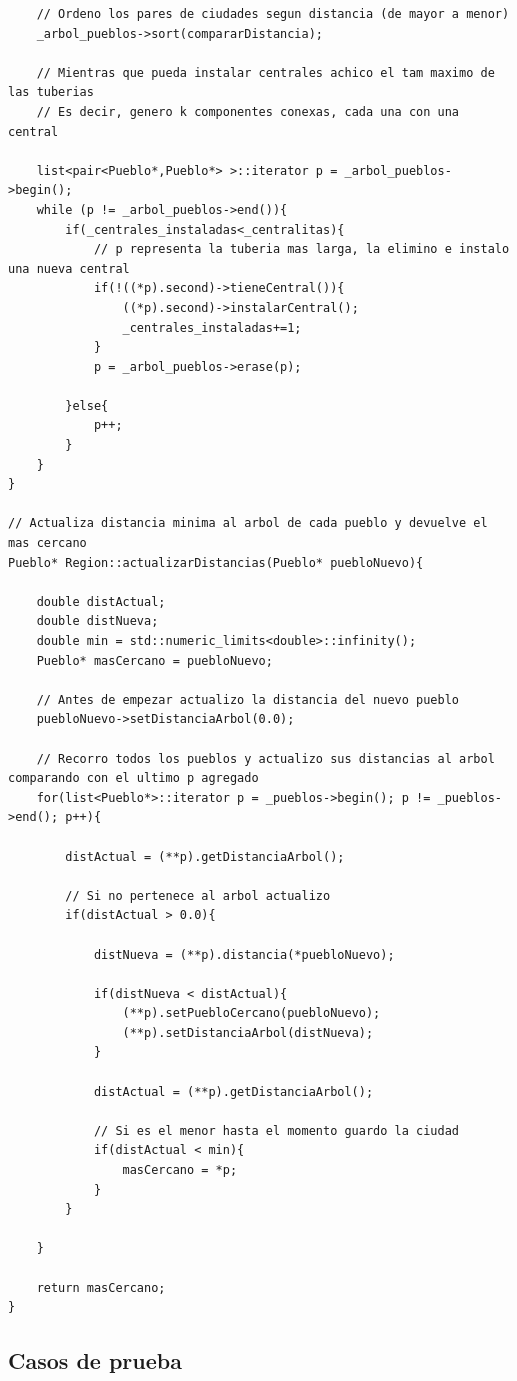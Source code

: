 \begin{lstlisting}
	// Ordeno los pares de ciudades segun distancia (de mayor a menor)
	_arbol_pueblos->sort(compararDistancia);

	// Mientras que pueda instalar centrales achico el tam maximo de las tuberias
	// Es decir, genero k componentes conexas, cada una con una central

	list<pair<Pueblo*,Pueblo*> >::iterator p = _arbol_pueblos->begin();
	while (p != _arbol_pueblos->end()){
		if(_centrales_instaladas<_centralitas){
			// p representa la tuberia mas larga, la elimino e instalo una nueva central
			if(!((*p).second)->tieneCentral()){
				((*p).second)->instalarCentral();
				_centrales_instaladas+=1;
			}
			p = _arbol_pueblos->erase(p);
			
		}else{
			p++;
		}
	}
}

// Actualiza distancia minima al arbol de cada pueblo y devuelve el mas cercano
Pueblo* Region::actualizarDistancias(Pueblo* puebloNuevo){

	double distActual;
	double distNueva;
	double min = std::numeric_limits<double>::infinity();
	Pueblo* masCercano = puebloNuevo;

	// Antes de empezar actualizo la distancia del nuevo pueblo
	puebloNuevo->setDistanciaArbol(0.0);

	// Recorro todos los pueblos y actualizo sus distancias al arbol comparando con el ultimo p agregado
	for(list<Pueblo*>::iterator p = _pueblos->begin(); p != _pueblos->end(); p++){

		distActual = (**p).getDistanciaArbol();

		// Si no pertenece al arbol actualizo
		if(distActual > 0.0){

			distNueva = (**p).distancia(*puebloNuevo);
			
			if(distNueva < distActual){
				(**p).setPuebloCercano(puebloNuevo);
				(**p).setDistanciaArbol(distNueva);
			}

			distActual = (**p).getDistanciaArbol();

			// Si es el menor hasta el momento guardo la ciudad
			if(distActual < min){
				masCercano = *p;
			}
		}
	
	}

	return masCercano;
}

\end{lstlisting}

\subsection{Casos de prueba}

